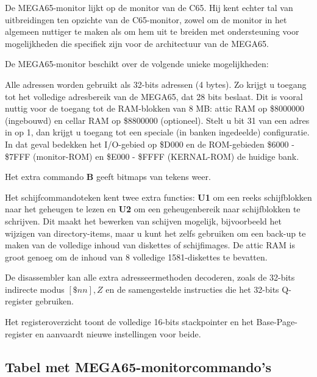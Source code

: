 De MEGA65-monitor lijkt op de monitor van de C65. Hij kent echter tal van uitbreidingen ten opzichte van de C65-monitor, zowel om de monitor in het algemeen nuttiger te maken als om hem uit te breiden met ondersteuning voor mogelijkheden die specifiek zijn voor de architectuur van de MEGA65.

De MEGA65-monitor beschikt over de volgende unieke mogelijkheden:

\begin{description}[leftmargin=1cm,style=nextline]
\item[Adressen:] Alle adressen worden gebruikt als 32-bits adressen (4 bytes). Zo krijgt u toegang tot het volledige adresbereik van de MEGA65, dat 28 bits beslaat. Dit is vooral nuttig voor de toegang tot de RAM-blokken van 8 MB: attic RAM op \$8000000 (ingebouwd) en cellar RAM op \$8800000 (optioneel). Stelt u bit 31 van een adres in op 1, dan krijgt u toegang tot een speciale (in banken ingedeelde) configuratie. In dat geval bedekken het I/O-gebied op \$D000 en de ROM-gebieden \$6000 - \$7FFF (monitor-ROM) en \$E000 - \$FFFF (KERNAL-ROM) de huidige bank.

\item[Commando's:] Het extra commando {\bf B} geeft bitmaps van tekens weer.

\item[Schijftoegang:] Het schijfcommandoteken {\bf \@} kent twee extra functies: {\bf U1} om een reeks schijfblokken naar het geheugen te lezen en {\bf U2} om een geheugenbereik naar schijfblokken te schrijven. Dit maakt het bewerken van schijven mogelijk, bijvoorbeeld het wijzigen van directory-items, maar u kunt het zelfs gebruiken om een back-up te maken van de volledige inhoud van diskettes of schijfimages. De attic RAM is groot genoeg om de inhoud van 8 volledige 1581-diskettes te bevatten.

\item[Disassembler:] De disassembler kan alle extra adresseermethoden decoderen, zoals de 32-bits indirecte modus $[\$nn],Z$ en de samengestelde instructies die het 32-bits Q-register gebruiken.

\item[Register:] Het registeroverzicht toont de volledige 16-bits stackpointer en het Base-Page-register en aanvaardt nieuwe instellingen voor beide.

\end{description}



\subsection{Tabel met MEGA65-monitorcommando's}

